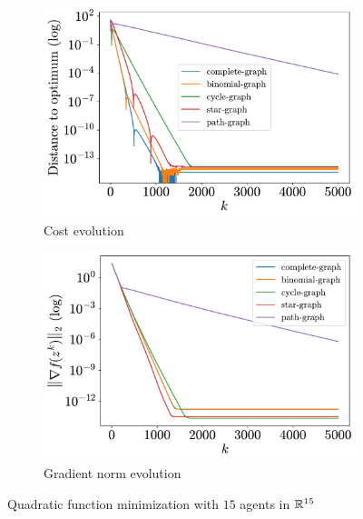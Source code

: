 \documentclass[a4paper,11pt,oneside]{book}
\begin{document}
\begin{figure}[H]
      \centering
      \begin{subfigure}[t]{0.46\linewidth}
            \centering
            \includegraphics[width=\linewidth]{./figs/quadratic/15_15/distance.pdf} 
            \caption{Cost evolution}
      \end{subfigure}
      \hfill
      \begin{subfigure}[t]{0.46\linewidth}
            \centering
            \includegraphics[width=\linewidth]{./figs/quadratic/15_15/gradient.pdf} 
            \caption{Gradient norm evolution}
      \end{subfigure}
      \caption{Quadratic function minimization with $15$ agents in ${\mathbb{R}}^{15}$}
      \label{fig:quadratic_15_15}
\end{figure}
\end{document}
